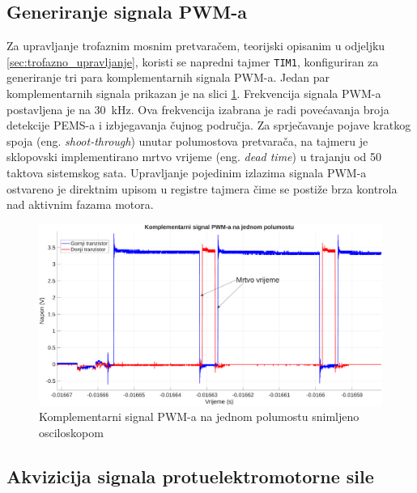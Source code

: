 \documentclass[diplomskirad]{fer}
\begin{document}
\subsection{Generiranje signala PWM-a}
\label{ssec:generiranje_pwm}

Za upravljanje trofaznim mosnim pretvaračem, teorijski opisanim u odjeljku
\ref{sec:trofazno_upravljanje}, koristi se napredni tajmer \texttt{TIM1},
konfiguriran za generiranje tri para komplementarnih signala PWM-a. Jedan par
komplementarnih signala prikazan je na slici \ref{fig:comp_scope}. Frekvencija
signala PWM-a postavljena je na \SI{30}{\kilo\hertz}. Ova frekvencija izabrana
je radi povećavanja broja detekcije PEMS-a i izbjegavanja čujnog područja. Za
sprječavanje pojave kratkog spoja (eng. \textit{shoot-through}) unutar
polumostova pretvarača, na tajmeru je sklopovski implementirano mrtvo vrijeme
(eng. \textit{dead time}) u trajanju od 50 taktova sistemskog sata. Upravljanje
pojedinim izlazima signala PWM-a ostvareno je direktnim upisom u registre
tajmera čime se postiže brza kontrola nad aktivnim fazama motora.
\begin{figure}[h!]
	\centering
	\includegraphics[width=\textwidth]{csv/comp.pdf}
	\caption{Komplementarni signal PWM-a na jednom polumostu snimljeno osciloskopom}
	\label{fig:comp_scope}
\end{figure}

\subsection{Akvizicija signala protuelektromotorne sile}
\label{ssec:akvizicija_pems}
\end{document}

